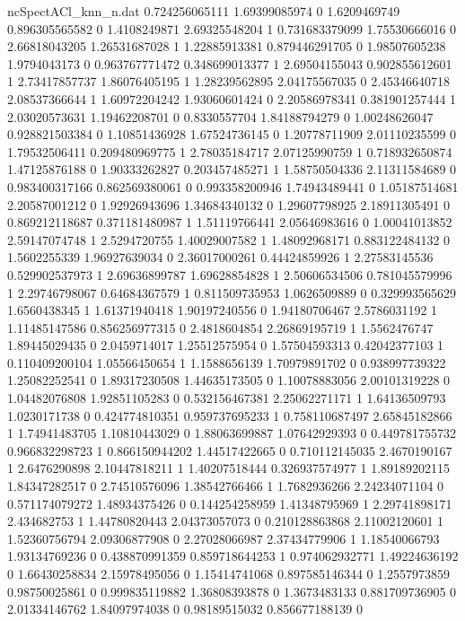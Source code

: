 \begin{filecontents}{ncSpectACl_knn_n.dat}
0.724256065111 1.69399085974 0
1.6209469749 0.896305565582 0
1.4108249871 2.69325548204 1
0.731683379099 1.75530666016 0
2.66818043205 1.26531687028 1
1.22885913381 0.879446291705 0
1.98507605238 1.9794043173 0
0.963767771472 0.348699013377 1
2.69504155043 0.902855612601 1
2.73417857737 1.86076405195 1
1.28239562895 2.04175567035 0
2.45346640718 2.08537366644 1
1.60972204242 1.93060601424 0
2.20586978341 0.381901257444 1
2.03020573631 1.19462208701 0
0.8330557704 1.84188794279 0
1.00248626047 0.928821503384 0
1.10851436928 1.67524736145 0
1.20778711909 2.01110235599 0
1.79532506411 0.209480969775 1
2.78035184717 2.07125990759 1
0.718932650874 1.47125876188 0
1.90333262827 0.203457485271 1
1.58750504336 2.11311584689 0
0.983400317166 0.862569380061 0
0.993358200946 1.74943489441 0
1.05187514681 2.20587001212 0
1.92926943696 1.34684340132 0
1.29607798925 2.18911305491 0
0.869212118687 0.371181480987 1
1.51119766441 2.05646983616 0
1.00041013852 2.59147074748 1
2.5294720755 1.40029007582 1
1.48092968171 0.883122484132 0
1.5602255339 1.96927639034 0
2.36017000261 0.44424859926 1
2.27583145536 0.529902537973 1
2.69636899787 1.69628854828 1
2.50606534506 0.781045579996 1
2.29746798067 0.64684367579 1
0.811509735953 1.0626509889 0
0.329993565629 1.6560438345 1
1.61371940418 1.90197240556 0
1.94180706467 2.5786031192 1
1.11485147586 0.856256977315 0
2.4818604854 2.26869195719 1
1.5562476747 1.89445029435 0
2.0459714017 1.25512575954 0
1.57504593313 0.42042377103 1
0.110409200104 1.05566450654 1
1.1588656139 1.70979891702 0
0.938997739322 1.25082252541 0
1.89317230508 1.44635173505 0
1.10078883056 2.00101319228 0
1.04482076808 1.92851105283 0
0.532156467381 2.25062271171 1
1.64136509793 1.0230171738 0
0.424774810351 0.959737695233 1
0.758110687497 2.65845182866 1
1.74941483705 1.10810443029 0
1.88063699887 1.07642929393 0
0.449781755732 0.966832298723 1
0.866150944202 1.44517422665 0
0.710112145035 2.4670190167 1
2.6476290898 2.10447818211 1
1.40207518444 0.326937574977 1
1.89189202115 1.84347282517 0
2.74510576096 1.38542766466 1
1.7682936266 2.24234071104 0
0.571174079272 1.48934375426 0
0.144254258959 1.41348795969 1
2.29741898171 2.434682753 1
1.44780820443 2.04373057073 0
0.210128863868 2.11002120601 1
1.52360756794 2.09306877908 0
2.27028066987 2.37434779906 1
1.18540066793 1.93134769236 0
0.438870991359 0.859718644253 1
0.974062932771 1.49224636192 0
1.66430258834 2.15978495056 0
1.15414741068 0.897585146344 0
1.2557973859 0.98750025861 0
0.999835119882 1.36808393878 0
1.3673483133 0.881709736905 0
2.01334146762 1.84097974038 0
0.98189515032 0.856677188139 0

\end{filecontents}
